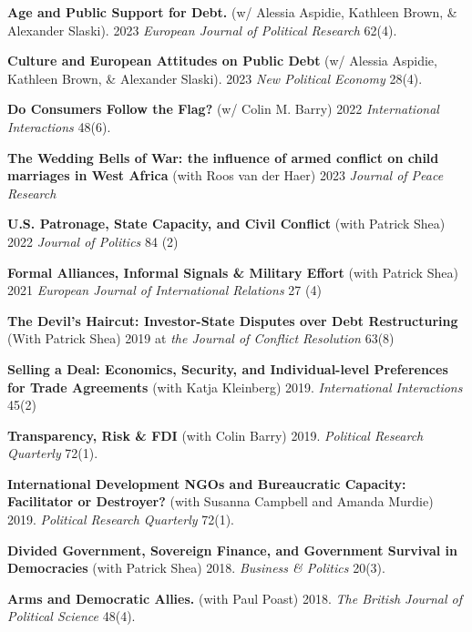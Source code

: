 \documentclass[letterpaper]{article}
\begin{document}
\begin{etaremune}
\item \textbf{Age and Public Support for Debt.} (w/ Alessia Aspidie, Kathleen Brown, \& Alexander Slaski). 2023 \emph{European Journal of Political Research} 62(4).

\item \textbf{Culture and European Attitudes on Public Debt } (w/ Alessia Aspidie, Kathleen Brown, \& Alexander Slaski). 2023 \emph{New Political Economy} 28(4).

\item \textbf{Do Consumers Follow the Flag?} (w/ Colin M. Barry) 2022 \emph{International Interactions} 48(6).

\item \textbf{The Wedding Bells of War: the influence of armed conflict on child marriages in West Africa} (with Roos van der Haer) 2023 \emph{Journal of Peace Research}

\item \textbf{U.S. Patronage, State Capacity, and Civil Conflict} (with Patrick Shea) 2022 \emph{Journal of Politics} 84 (2)

\item \textbf{Formal Alliances, Informal Signals \& Military Effort} (with Patrick Shea) 2021 \emph{European Journal of International Relations} 27 (4)

\item  \textbf{The Devil's Haircut: Investor-State Disputes over Debt Restructuring} (With Patrick Shea) 2019 at \emph{the Journal of Conflict Resolution} 63(8)

\item \textbf{Selling a Deal: Economics, Security, and Individual-level Preferences for Trade Agreements} (with Katja Kleinberg) 2019.   \emph{International Interactions} 45(2)

\item \textbf{Transparency, Risk \& FDI } (with Colin Barry) 2019. \emph{Political Research Quarterly} 72(1). 

\item \textbf{International Development NGOs and Bureaucratic Capacity: Facilitator or Destroyer?} (with Susanna Campbell and Amanda Murdie) 2019. \emph{Political Research Quarterly} 72(1).

\item \textbf{Divided Government, Sovereign Finance, and Government Survival in Democracies} (with Patrick Shea) 2018. \emph{Business \& Politics} 20(3). 

\item \textbf{Arms and Democratic Allies.} (with Paul Poast) 2018. \emph{The British Journal of Political Science} 48(4).


\end{etaremune}
\end{document}
